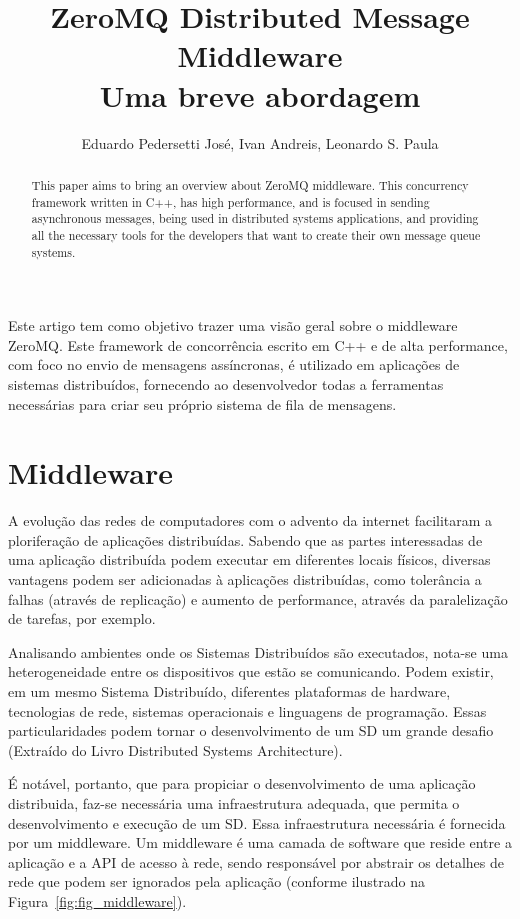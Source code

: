 \documentclass[12pt]{article}
\title{ZeroMQ Distributed Message Middleware\\Uma breve abordagem}
\author{Eduardo Pedersetti José\inst{1}, Ivan Andreis\inst{1}, Leonardo S. Paula\inst{1}}
\begin{document}
 

\maketitle

\begin{abstract}
  This paper aims to bring an overview about ZeroMQ middleware. This concurrency framework written in C++, has high performance, and is focused in sending asynchronous messages, being used in distributed systems applications, and providing all the necessary tools for the developers that want to create their own message queue systems.
\end{abstract}
     
\begin{resumo} 
   Este artigo tem como objetivo trazer uma visão geral sobre o middleware ZeroMQ. Este framework de concorrência escrito em C++ e de alta performance, com foco no envio de mensagens assíncronas, é utilizado em aplicações de sistemas distribuídos, fornecendo ao desenvolvedor todas a ferramentas necessárias para criar seu próprio sistema de fila de mensagens.
\end{resumo}

\section{Middleware}
	A evolução das redes de computadores com o advento da internet facilitaram a ploriferação 
de aplicações distribuídas. Sabendo que as partes interessadas de uma aplicação
distribuída podem executar em diferentes locais físicos, diversas vantagens podem ser
adicionadas à aplicações distribuídas, como tolerância a falhas (através de replicação) e
aumento de performance, através da paralelização de tarefas, por exemplo.

	Analisando ambientes onde os Sistemas Distribuídos são executados, nota-se uma
heterogeneidade entre os dispositivos que estão se comunicando. Podem existir, em um 
mesmo Sistema Distribuído, diferentes plataformas de hardware, tecnologias de rede,
sistemas operacionais e linguagens de programação. Essas particularidades podem tornar o desenvolvimento de um SD um grande desafio  (Extraído do Livro Distributed Systems
Architecture).

	É notável, portanto, que para propiciar o desenvolvimento de uma aplicação distribuida, faz-se necessária uma infraestrutura adequada, que permita o desenvolvimento e execução de um SD. Essa infraestrutura necessária é fornecida por um middleware. Um middleware é uma camada de software que reside entre a aplicação e a API de acesso à rede, sendo responsável por abstrair os detalhes de rede que podem ser ignorados pela aplicação (conforme ilustrado na Figura~\ref{fig:fig_middleware}).
\end{document}
